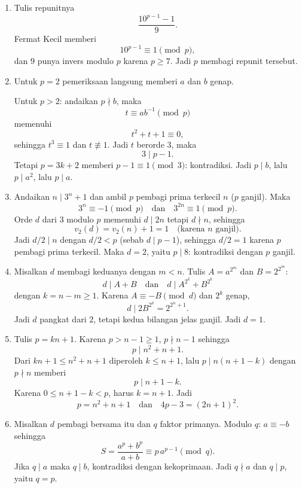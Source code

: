 \documentclass[12pt]{scrartcl}
\begin{document}
\begin{enumerate}[resume]
	\item Tulis repunitnya
	\[ \frac{10^{p-1} - 1}{9}. \]
	Fermat Kecil memberi
	\[ 10^{p-1} \equiv 1 \pmod{p}, \]
	dan $9$ punya invers modulo $p$ karena $p \ge 7$.
	Jadi $p$ membagi repunit tersebut.

	\item Untuk $p = 2$ pemeriksaan langsung memberi $a$ dan $b$ genap.

	Untuk $p > 2$: andaikan $p \nmid b$, maka
	\[ t \equiv ab^{-1} \pmod{p} \]
	memenuhi
	\[ t^2 + t + 1 \equiv 0, \]
	sehingga $t^3 \equiv 1$ dan $t \not\equiv 1$.
	Jadi $t$ berorde $3$, maka
	\[ 3 \mid p - 1. \]
	Tetapi $p = 3k + 2$ memberi $p - 1 \equiv 1 \pmod{3}$: kontradiksi.
	Jadi $p \mid b$, lalu $p \mid a^2$, lalu $p \mid a$.

	\item Andaikan $n \mid 3^n + 1$ dan ambil $p$ pembagi prima terkecil $n$ ($p$ ganjil).
	Maka
	\[ 3^n \equiv -1 \pmod{p} \quad \text{dan} \quad 3^{2n} \equiv 1 \pmod{p}. \]
	Orde $d$ dari $3$ modulo $p$ memenuhi $d \mid 2n$ tetapi $d \nmid n$,
	sehingga
	\[ v_2(d) = v_2(n) + 1 = 1 \quad \text{(karena $n$ ganjil)}. \]
	Jadi $d/2 \mid n$ dengan $d/2 < p$ (sebab $d \mid p - 1$),
	sehingga $d/2 = 1$ karena $p$ pembagi prima terkecil.
	Maka $d = 2$, yaitu $p \mid 8$: kontradiksi dengan $p$ ganjil.

	\item Misalkan $d$ membagi keduanya dengan $m < n$.
	Tulis $A = a^{2^m}$ dan $B = 2^{2^m}$:
	\[ d \mid A + B \quad \text{dan} \quad d \mid A^{2^k} + B^{2^k} \]
	dengan $k = n - m \ge 1$.
	Karena $A \equiv -B \pmod{d}$ dan $2^k$ genap,
	\[ d \mid 2B^{2^k} = 2^{2^n + 1}. \]
	Jadi $d$ pangkat dari $2$, tetapi kedua bilangan jelas ganjil.
	Jadi $d = 1$.

	\item Tulis $p = kn + 1$. Karena $p > n - 1 \ge 1$,
	$p \nmid n - 1$ sehingga
	\[ p \mid n^2 + n + 1. \]
	Dari $kn + 1 \le n^2 + n + 1$ diperoleh $k \le n + 1$,
	lalu $p \mid n(n + 1 - k)$ dengan $p \nmid n$ memberi
	\[ p \mid n + 1 - k. \]
	Karena $0 \le n + 1 - k < p$, harus $k = n + 1$.
	Jadi
	\[ p = n^2 + n + 1 \quad \text{dan} \quad 4p - 3 = (2n+1)^2. \]

	\item Misalkan $d$ pembagi bersama itu dan $q$ faktor primanya.
	Modulo $q$: $a \equiv -b$ sehingga
	\[ S = \frac{a^p+b^p}{a+b} \equiv p\,a^{p-1} \pmod{q}. \]
	Jika $q \mid a$ maka $q \mid b$, kontradiksi dengan kekoprimaan.
	Jadi $q \nmid a$ dan $q \mid p$, yaitu $q = p$.


\end{enumerate}
\end{document}
